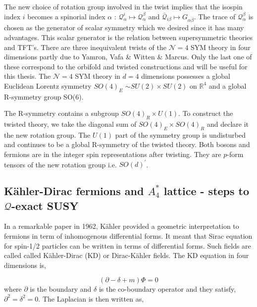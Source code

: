 The new choice of rotation group involved in the twist implies that the isospin index $\textit{i}$ 
becomes a spinorial index $\alpha$ : $ \mathcal{Q}^{i}_{\alpha} \mapsto \mathcal{Q}^{\beta}_{\alpha}$ 
and $\bar{\mathcal{Q}}_{i \beta} \mapsto G_{\alpha\dot{\beta}}$. The trace of $ \mathcal{Q}^{\beta}_{\alpha}$ 
is chosen as the generator of scalar symmetry which we desired since it has many advantages. 
This scalar generator is the relation between supersymmetric theories and TFT's. There are three
 inequivalent twists of the $\mathcal{N}=4$ SYM theory in four dimensions partly due to Yamron, 
 Vafa \& Witten  \& Marcus. Only the last one of these correspond to the orbifold and twisted constructions 
 and will be useful for this thesis. The $\mathcal{N}=4$ SYM theory in $d=4$ dimensions possesses a 
 global Euclidean Lorentz symmetry 
$SO(4)_{E}$ $\sim SU(2) \times SU(2) $ on $\mathbb{R}^{4}$ and a global R-symmetry group SO(6). 

The R-symmetry contains a subgroup $SO(4)_{R} \times U(1)$. 
To construct the twisted theory, we take the diagonal sum of $SO(4)_{E} \times SO(4)_{R}$ and declare it the new rotation group. 
The $U(1)$ part of the symmetry group is undisturbed and continues to be a global R-symmetry of the twisted theory.
Both bosons and fermions are in the integer spin representations after twisting. They are $p$-form tensors of the 
new rotation group i.e. $SO(d)^{\prime}$. 





\subsection{K\"{a}hler-Dirac fermions and $A_{4}^{*}$ lattice - steps to $\mathcal{Q}$-exact SUSY} 

In a remarkable paper in 1962, K\"{a}hler provided a geometric interpretation to fermions in term of inhomogenous differential forms. 
It meant that Sirac equation for spin-1/2 particles can be written in terms of differential forms. Such fields are called called
K\"{a}hler-Dirac (KD) or Dirac-K\"{a}hler fields. The KD equation in four dimensions is, 

\begin{equation}
(\partial - \delta + m) \Phi = 0 
\end{equation}
where $\partial$ is the boundary and $\delta$ is the co-boundary operator and they satisfy, $\partial^2 = \delta^2 = 0$. The Laplacian is then written as,

